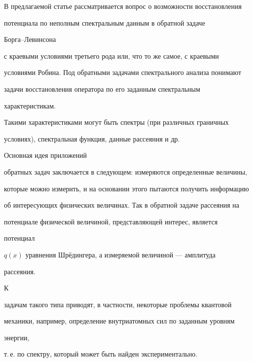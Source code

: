  




\maketitle 


\label{begin} 


 


 


В предлагаемой статье рассматривается вопрос о возможности восстановления 


потенциала по неполным спектральным данным в обратной задаче 


Борга--Левинсона 


с краевыми условиями третьего рода или, что то же самое, с краевыми 


условиями Робина. Под обратными задачами спектрального анализа понимают 


задачи восстановления оператора по его заданным спектральным 


характеристикам. 


Такими характеристиками могут быть спектры (при различных граничных 


условиях), спектральная функция, данные рассеяния и др. 


Основная идея приложений 


обратных задач заключается в следующем: измеряются определенные величины, 


которые можно измерить, и на основании этого пытаются получить информацию 


об интересующих физических величинах. Так в обратной задаче рассеяния на 


потенциале физической величиной, представляющей интерес, является 


потенциал 


$q(x)$ уравнения Шр\"едингера, а измеряемой величиной --- амплитуда 


рассеяния. 


К 


задачам такого типа приводят, в частности, некоторые проблемы квантовой 


механики, например, определение внутриатомных сил по заданным уровням 


энергии, 


т.\,е. по спектру, который может быть найден экспериментально. 


